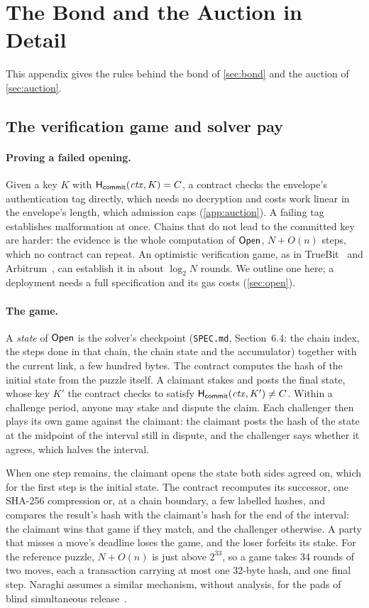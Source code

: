 \section{The Bond and the Auction in Detail}\label{app:bond}

This appendix gives the rules behind the bond of \cref{sec:bond} and the auction of \cref{sec:auction}.

\subsection{The verification game and solver pay}

\paragraph{Proving a failed opening.}
Given a key $K$ with $\mathsf{H}_{\mathsf{commit}}(\mathit{ctx}, K) = C$, a contract checks the envelope's authentication tag directly, which needs no decryption and costs work linear in the envelope's length, which admission caps (\cref{app:auction}). A failing tag establishes malformation at once. Chains that do not lead to the committed key are harder: the evidence is the whole computation of $\mathsf{Open}$, $N + O(n)$ steps, which no contract can repeat. An optimistic verification game, as in TrueBit~\cite{TR17} and Arbitrum~\cite{Arbitrum18}, can establish it in about $\log_2 N$ rounds. We outline one here; a deployment needs a full specification and its gas costs (\cref{sec:open}).

\paragraph{The game.}
A \emph{state} of $\mathsf{Open}$ is the solver's checkpoint (\texttt{SPEC.md}, Section~6.4: the chain index, the steps done in that chain, the chain state and the accumulator) together with the current link, a few hundred bytes. The contract computes the hash of the initial state from the puzzle itself. A claimant stakes and posts the final state, whose key $K'$ the contract checks to satisfy $\mathsf{H}_{\mathsf{commit}}(\mathit{ctx}, K') \neq C$. Within a challenge period, anyone may stake and dispute the claim. Each challenger then plays its own game against the claimant: the claimant posts the hash of the state at the midpoint of the interval still in dispute, and the challenger says whether it agrees, which halves the interval.

When one step remains, the claimant opens the state both sides agreed on, which for the first step is the initial state. The contract recomputes its successor, one SHA-256 compression or, at a chain boundary, a few labelled hashes, and compares the result's hash with the claimant's hash for the end of the interval: the claimant wins that game if they match, and the challenger otherwise. A party that misses a move's deadline loses the game, and the loser forfeits its stake. For the reference puzzle, $N + O(n)$ is just above $2^{33}$, so a game takes 34 rounds of two moves, each a transaction carrying at most one 32-byte hash, and one final step. Naraghi assumes a similar mechanism, without analysis, for the pads of blind simultaneous release~\cite{Naraghi26}.

